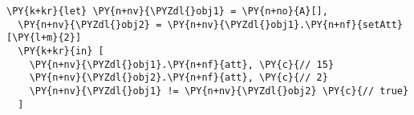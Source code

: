 \begin{Verbatim}[commandchars=\\\{\}]
\PY{k+kr}{let} \PY{n+nv}{\PYZdl{}obj1} = \PY{n+no}{A}[],
  \PY{n+nv}{\PYZdl{}obj2} = \PY{n+nv}{\PYZdl{}obj1}.\PY{n+nf}{setAtt}[\PY{l+m}{2}]
  \PY{k+kr}{in} [
    \PY{n+nv}{\PYZdl{}obj1}.\PY{n+nf}{att}, \PY{c}{// 15}
    \PY{n+nv}{\PYZdl{}obj2}.\PY{n+nf}{att}, \PY{c}{// 2}
    \PY{n+nv}{\PYZdl{}obj1} != \PY{n+nv}{\PYZdl{}obj2} \PY{c}{// true}
  ]
\end{Verbatim}
